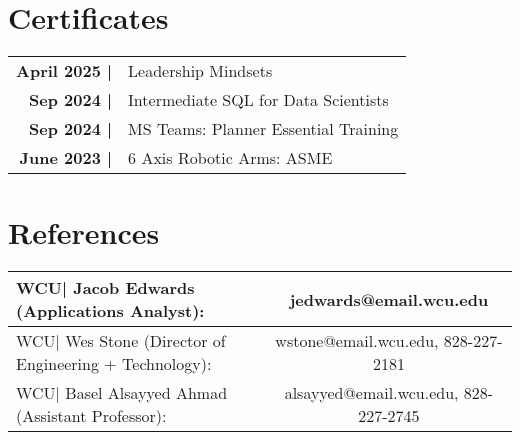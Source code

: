 \documentclass[allblack]{simplehipstercv}
\begin{document}
\begin{paracol}{2}
\section*{Certificates}
\begin{tabular}{>{\footnotesize\bfseries}r p{}}
    April 2025 | & Leadership Mindsets \\
    Sep 2024 | & Intermediate SQL for Data Scientists \\
    Sep 2024 | & MS Teams: Planner Essential Training \\
    June 2023 | & 6 Axis Robotic Arms: ASME \\
\end{tabular}

\section*{References}
\begin{tabular}{l c}
    WCU| Jacob Edwards (Applications Analyst): & jedwards@email.wcu.edu\\
    \hline
    WCU| Wes Stone (Director of Engineering + Technology): & wstone@email.wcu.edu, 828-227-2181\\
    \hline
    WCU| Basel Alsayyed Ahmad (Assistant Professor): & alsayyed@email.wcu.edu, 828-227-2745\\
\end{tabular}
\bigskip
\newpage

\end{paracol}
\end{document}
